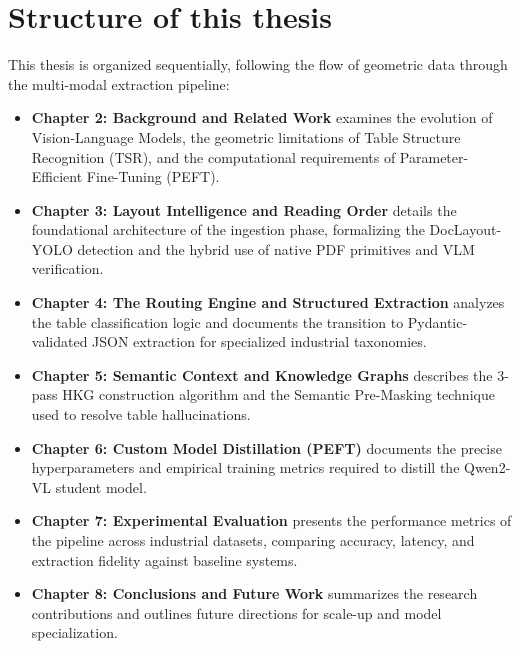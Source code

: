 \section{Structure of this thesis}
\label{sec:structure}

This thesis is organized sequentially, following the flow of geometric data through the multi-modal extraction pipeline:

\begin{itemize}
    \item \textbf{Chapter 2: Background and Related Work} examines the evolution of Vision-Language Models, the geometric limitations of Table Structure Recognition (TSR), and the computational requirements of Parameter-Efficient Fine-Tuning (PEFT).

    \item \textbf{Chapter 3: Layout Intelligence and Reading Order} details the foundational architecture of the ingestion phase, formalizing the DocLayout-YOLO detection and the hybrid use of native PDF primitives and VLM verification.

    \item \textbf{Chapter 4: The Routing Engine and Structured Extraction} analyzes the table classification logic and documents the transition to Pydantic-validated JSON extraction for specialized industrial taxonomies.

    \item \textbf{Chapter 5: Semantic Context and Knowledge Graphs} describes the 3-pass HKG construction algorithm and the Semantic Pre-Masking technique used to resolve table hallucinations.

    \item \textbf{Chapter 6: Custom Model Distillation (PEFT)} documents the precise hyperparameters and empirical training metrics required to distill the Qwen2-VL student model.

    \item \textbf{Chapter 7: Experimental Evaluation} presents the performance metrics of the pipeline across industrial datasets, comparing accuracy, latency, and extraction fidelity against baseline systems.

    \item \textbf{Chapter 8: Conclusions and Future Work} summarizes the research contributions and outlines future directions for scale-up and model specialization.
\end{itemize}